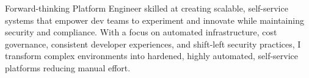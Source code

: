 \begin{cvparagraph}

Forward-thinking Platform Engineer skilled at creating scalable, self-service systems that empower dev
teams to experiment and innovate while maintaining security and compliance. With a focus on automated
infrastructure, cost governance, consistent developer experiences, and shift-left security practices,
I transform complex environments into hardened, highly automated, self-service platforms reducing manual effort.

\end{cvparagraph}

